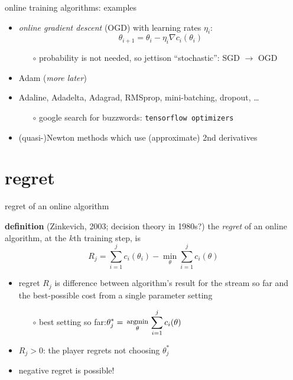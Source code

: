 \documentclass[xcolor={svgnames},
               hyperref={colorlinks,citecolor=DeepPink4,linkcolor=FireBrick,urlcolor=Maroon},
               usepdftitle=false]  %
               {beamer}
\newcommand{\grad}{\nabla}
\newcommand{\ds}{\displaystyle}
\begin{document}
\begin{frame}{online training algorithms: examples}

\begin{itemize}
\item \emph{online gradient descent} (OGD) with learning rates $\eta_i$:
   $$\theta_{i+1} = \theta_i - \eta_i \grad c_i(\theta_i)$$

    \begin{itemize}
    \item[$\circ$] probability is not needed, so jettison ``stochastic'': SGD $\to$ OGD
    \end{itemize}
\item Adam (\emph{more later})
\item Adaline, Adadelta, Adagrad, RMSprop, mini-batching, dropout, \dots
    \begin{itemize}
    \item[$\circ$] google search for buzzwords: \quad \texttt{tensorflow optimizers}
    \end{itemize}
\item (quasi-)Newton methods which use (approximate) 2nd derivatives
\end{itemize}
\end{frame}


\section{regret}

\begin{frame}{regret of an online algorithm}

\begin{block}{\textbf{definition} (Zinkevich, 2003; decision theory in 1980s?)}
the \emph{regret} of an online algorithm, at the $k$th training step, is
    $$R_j = \sum_{i=1}^j c_i(\theta_i) - \min_\theta \sum_{i=1}^j c_i(\theta)$$
\end{block}

\begin{itemize}
\item regret $R_j$ is difference between algorithm's result for the stream so far and the best-possible cost from a single parameter setting
    \begin{itemize}
    \item[$\circ$] best setting so far:\quad  $\ds \theta_j^* = \begin{smallmatrix} \phantom{x} \\ \text{\footnotesize argmin} \\ \theta \end{smallmatrix} \sum_{i=1}^j c_i(\theta)$
    \end{itemize}

\smallskip
\item $R_j>0$: the player regrets not choosing $\theta_j^*$
\item negative regret is possible!
\end{itemize}
\end{frame}
\end{document}
